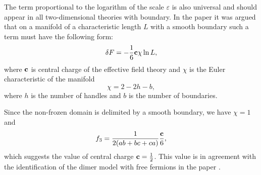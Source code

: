 \documentclass{article}
\begin{document}
The term proportional to the logarithm of the scale $\varepsilon$ is also universal
\cite{cardy1988finite} and should appear in all two-dimensional theories with boundary. In the paper
\cite{cardy1988finite} it was argued that on a manifold of a characteristic length $L$ with a smooth
boundary such a term must have the following form:
\begin{equation}
  \label{eq:31}
  \delta F = -\frac{1}{6}{\bf c} \chi \ln L,
\end{equation}
where ${\bf c}$ is central charge of the effective field theory and $\chi$ is the Euler characteristic of
the manifold
\begin{equation}
  \label{eq:32}
  \chi=2-2 h-b,
\end{equation}
where $h$ is the number of handles and $b$ is the number of boundaries. 

Since the non-frozen domain is delimited by a smooth boundary, we have $\chi=1$ and
\begin{equation}
  \label{eq:33}
  f_{3}=\frac{1}{2(ab+bc+ca)} \frac{{\bf c}}{6},
\end{equation}
which suggests the value of central charge ${\bf c}=\frac{1}{2}$. This value is in agreement with the
identification of the dimer model with free fermions in the paper \cite{dijkgraaf2009dimer}. 

\end{document}
